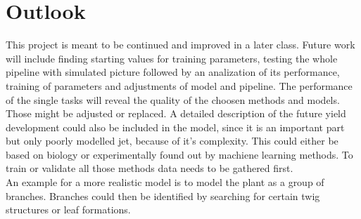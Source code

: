 \section{Outlook}\label{sec:outlook}

This project is meant to be continued and improved in a later class. Future work will include finding starting values for training parameters, testing the whole pipeline with simulated picture followed by an analization of its performance, training of parameters and
adjustments of model and pipeline. The performance of the single tasks will reveal the quality of the choosen methods and models. Those might be adjusted or replaced. A detailed description of the future yield development could also be included in the model, since it is an important part but only poorly modelled jet, because of it's complexity. This could either be based on biology or experimentally found out by machiene learning methods. To train or validate all those methods data needs to be gathered first.\\
An example for a more realistic model is to model the plant as a group of branches. Branches could then be identified by searching for certain twig structures or leaf formations.\\
